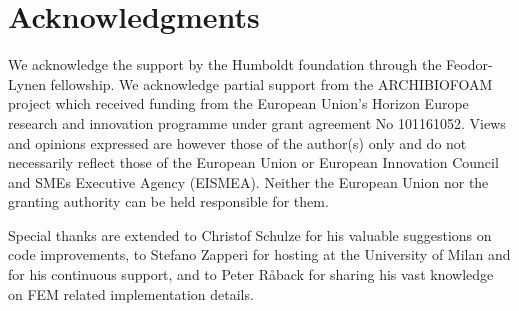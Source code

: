 \documentclass[11pt]{article}
\begin{document}
\section*{Acknowledgments}

We acknowledge the support by the Humboldt foundation through the Feodor-Lynen
fellowship. We acknowledge partial support from the ARCHIBIOFOAM project which
received funding from the European Union's Horizon Europe research and
innovation programme under grant agreement No 101161052. Views and opinions
expressed are however those of the author(s) only and do not necessarily
reflect those of the European Union or European Innovation Council and SMEs
Executive Agency (EISMEA). Neither the European Union nor the granting
authority can be held responsible for them.

Special thanks are extended to Christof Schulze for his valuable suggestions on
code improvements, to Stefano Zapperi for hosting at the University of Milan
and for his continuous support, and to Peter R{\aa}back for sharing his vast
knowledge on FEM related implementation details.



\end{document}
